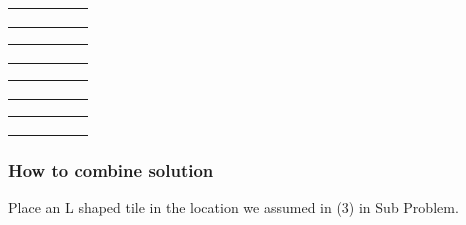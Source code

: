 \documentclass[12pt]{article}
\begin{document}
\begin{table}[!htbp]
    \centering
    \begin{tabular}{|M{20pt}|M{20pt}|M{20pt}|M{20pt}|N}
        \hline
          &                          &   &   \\[20pt]\hline
          &  &   &   \\[20pt] \hline
          &                          &   &   \\[20pt] \hline
          &                          &   &   \\[20pt] \hline
    \end{tabular}
    \vspace{2pt}
    \begin{tabular}{|M{20pt}|M{20pt}|M{20pt}|M{20pt}|N}
        \hline
                                 &   &   &   \\[20pt]\hline
                                 &   &   &   \\[20pt] \hline
                                 &   &   &   \\[20pt] \hline
         &   &   &   \\[20pt] \hline
    \end{tabular}

    \begin{tabular}{|M{20pt}|M{20pt}|M{20pt}|M{20pt}|N}
        \hline
          &   &   &  \\[20pt]\hline
          &   &   &                          \\[20pt] \hline
          &   &   &                          \\[20pt] \hline
          &   &   &                          \\[20pt] \hline
    \end{tabular}
    \begin{tabular}{|M{20pt}|M{20pt}|M{20pt}|M{20pt}|N}
        \hline
         &   &   &   \\[20pt]\hline
                                 &   &   &   \\[20pt] \hline
                                 &   &   &   \\[20pt] \hline
                                 &   &   &   \\[20pt] \hline
    \end{tabular}
\end{table}
\subsubsection{How to combine solution}
Place an L shaped tile in the location we assumed in (3) in Sub Problem.
\end{document}
